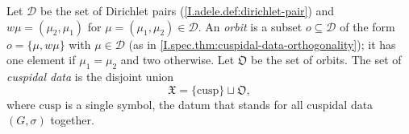 Let $\mathcal D$ be the set of Dirichlet pairs (\cref{I.adele.def:dirichlet-pair}) and $w\mu=(\mu_2,\mu_1)$ for $\mu=(\mu_1,\mu_2)\in\mathcal D$. An \emph{orbit} is a subset
$o\subseteq\mathcal D$ of the form $o=\{\mu,w\mu\}$ with $\mu\in\mathcal D$ (as in \cref{I.spec.thm:cuspidal-data-orthogonality}); it has one element if
$\mu_1=\mu_2$ and two otherwise. Let $\mathfrak O$ be the set of orbits. The set of \emph{cuspidal data} is the disjoint union
\[
  \mathfrak X=\{\mathrm{cusp}\}\sqcup\mathfrak O ,
\]
where $\mathrm{cusp}$ is a single symbol, the datum that stands for all cuspidal data $(G,\sigma)$ together.

